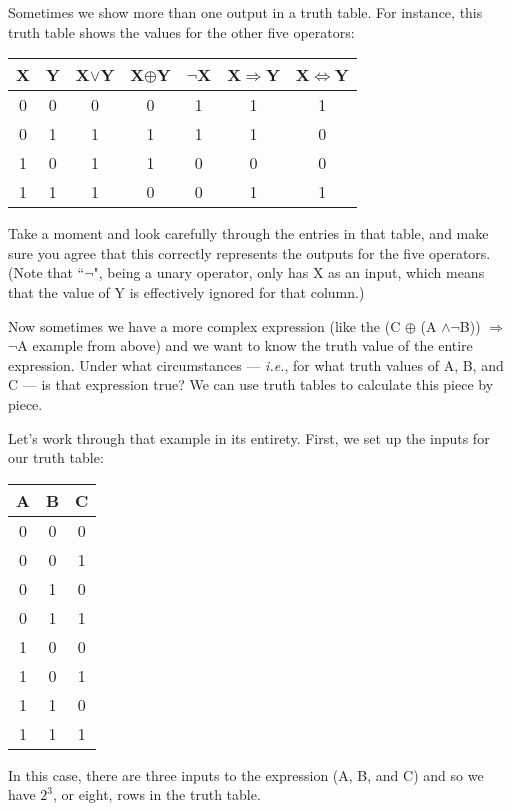 Sometimes we show more than one output in a truth table. For instance, this
truth table shows the values for the other five operators:
\begin{nobreak}
\begin{center}
\begin{tabular}{c c|c c c c c}
X & Y & X$\vee$Y & X$\oplus$Y & $\neg$X & X$\Rightarrow$Y &
X$\Leftrightarrow$Y \\
\hline
0 & 0 & 0 & 0 & 1 & 1 & 1 \\
0 & 1 & 1 & 1 & 1 & 1 & 0 \\
1 & 0 & 1 & 1 & 0 & 0 & 0 \\
1 & 1 & 1 & 0 & 0 & 1 & 1 \\
\end{tabular}
\end{center}
\end{nobreak}
Take a moment and look carefully through the entries in that table, and
make sure you agree that this correctly represents the outputs for the five
operators. (Note that ``$\neg$", being a unary operator, only has X as an
input, which means that the value of Y is effectively ignored for that
column.)

Now sometimes we have a more complex expression (like the (C $\oplus$ (A
$\wedge \neg$B)) $\Rightarrow$ $\neg$A example from above) and we want to
know the truth value of the entire expression. Under what circumstances ---
\textit{i.e.}, for what truth values of A, B, and C --- is that expression
true? We can use truth tables to calculate this piece by piece.

Let's work through that example in its entirety. First, we set up the
inputs for our truth table:
\begin{nobreak}
\begin{center}
\begin{tabular}{c c c|}
A & B & C \\
\hline
0 & 0 & 0 \\
0 & 0 & 1 \\
0 & 1 & 0 \\
0 & 1 & 1 \\
1 & 0 & 0 \\
1 & 0 & 1 \\
1 & 1 & 0 \\
1 & 1 & 1 \\
\end{tabular}
\end{center}
\end{nobreak}
In this case, there are three inputs to the expression (A, B, and C) and so
we have $2^3$, or eight, rows in the truth table.

